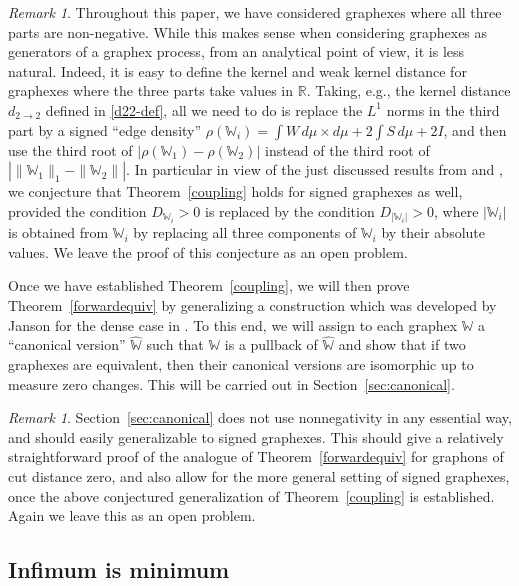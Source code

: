 \documentclass{amsart}
\numberwithin{equation}{section}
\numberwithin{figure}{section}
\theoremstyle{definition}
\theoremstyle{remark}
\newtheorem{remark}[theorem]{Remark}
\newcommand{\RR}{\mathbb{R}}
\newcommand{\cW}{\mathbb{W}}
\def\d22{d_{2\to 2}}
\begin{document}
\begin{remark}\label{rem:coupling-signed-generalization}
Throughout this paper, we have considered graphexes where all three parts are
non-negative. While this makes sense when considering graphexes as generators
of a graphex process, from an analytical point of view, it is less natural.
Indeed, it is easy to define the kernel and weak kernel distance for
graphexes where the three parts take values in $\RR$. Taking, e.g., the
kernel distance $\d22$ defined in \eqref{d22-def}, all we need to do is
replace the $L^1$ norms in the third part by a signed ``edge density''
$\rho(\cW_i)=\int W \,d\mu\times d\mu +2 \int S \,d\mu + 2I$, and then use
the third root of $|\rho(\cW_1)-\rho(\cW_2)|$ instead of the third root of
$|\|\cW_1\|_1-\|\cW_2\||$. In particular in view of the just discussed
results from \cite{BCCH16} and \cite{JANSON16}, we conjecture that
Theorem~\ref{coupling} holds for signed graphexes as well, provided the
condition $D_{\cW_i}>0$ is replaced by the condition $D_{|\cW_i|}>0$, where
$|\cW_i|$ is obtained from $\cW_i$ by replacing all three components of
$\cW_i$ by their absolute values. We leave the proof of this conjecture as an
open problem.
\end{remark}

Once we have established Theorem~\ref{coupling}, we will then prove
Theorem~\ref{forwardequiv} by generalizing a construction which was developed
by Janson for the dense case in \cite{JANSON13}. To this end, we will assign
to each graphex $\cW$ a ``canonical version'' $\widehat{\cW}$ such that $\cW$
is a pullback of $\widehat{\cW}$ and show that if two graphexes are
equivalent, then their canonical versions are isomorphic up to measure zero
changes. This will be carried out in Section~\ref{sec:canonical}.

\begin{remark}\label{rem:forwardequivsigned-generalization}
Section~\ref{sec:canonical} does not use nonnegativity in any essential way,
and should easily generalizable to signed graphexes. This should give a
relatively straightforward proof of the analogue of
Theorem~\ref{forwardequiv} for graphons of cut distance zero, and also allow
for the more general setting of signed graphexes, once the above conjectured
generalization of Theorem~\ref{coupling} is established. Again we leave this
as an open problem.
\end{remark}

\subsection{Infimum is minimum} \label{sec:infmin}
\end{document}
